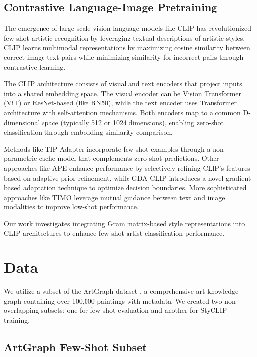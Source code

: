 \documentclass[conference,6pt]{IEEEtran}
\begin{document}
\subsection{Contrastive Language-Image Pretraining}
The emergence of large-scale vision-language models like CLIP \cite{CLIP} has revolutionized few-shot artistic recognition by leveraging textual descriptions of artistic styles. CLIP learns multimodal representations by maximizing cosine similarity between correct image-text pairs while minimizing similarity for incorrect pairs through contrastive learning.

The CLIP architecture consists of visual and text encoders that project inputs into a shared embedding space. The visual encoder can be Vision Transformer (ViT) or ResNet-based (like RN50), while the text encoder uses Transformer architecture with self-attention mechanisms. Both encoders map to a common D-dimensional space (typically 512 or 1024 dimensions), enabling zero-shot classification through embedding similarity comparison.

Methods like TIP-Adapter \cite{TipAdapter} incorporate few-shot examples through a non-parametric cache model that complements zero-shot predictions. Other approaches like APE \cite{APE} enhance performance by selectively refining CLIP's features based on adaptive prior refinement, while GDA-CLIP \cite{GDA_CLIP} introduces a novel gradient-based adaptation technique to optimize decision boundaries. More sophisticated approaches like TIMO \cite{TIMO} leverage mutual guidance between text and image modalities to improve low-shot performance.

Our work investigates integrating Gram matrix-based style representations into CLIP architectures to enhance few-shot artist classification performance.

\section{Data}

We utilize a subset of the ArtGraph dataset \cite{ArtGraph}, a comprehensive art knowledge graph containing over 100,000 paintings with metadata. We created two non-overlapping subsets: one for few-shot evaluation and another for StyCLIP training.

\subsection{ArtGraph Few-Shot Subset}
\end{document}
